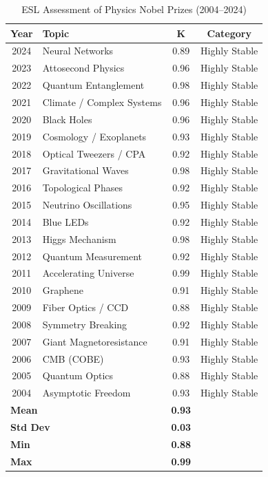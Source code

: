 \documentclass[11pt,a4paper]{article}
\begin{document}
\begin{table}[h]
\centering
\caption{ESL Assessment of Physics Nobel Prizes (2004--2024)}
\begin{tabular}{clcc}
\toprule
\textbf{Year} & \textbf{Topic} & \textbf{K} & \textbf{Category} \\
\midrule
2024 & Neural Networks & 0.89 & Highly Stable \\
2023 & Attosecond Physics & 0.96 & Highly Stable \\
2022 & Quantum Entanglement & 0.98 & Highly Stable \\
2021 & Climate / Complex Systems & 0.96 & Highly Stable \\
2020 & Black Holes & 0.96 & Highly Stable \\
2019 & Cosmology / Exoplanets & 0.93 & Highly Stable \\
2018 & Optical Tweezers / CPA & 0.92 & Highly Stable \\
2017 & Gravitational Waves & 0.98 & Highly Stable \\
2016 & Topological Phases & 0.92 & Highly Stable \\
2015 & Neutrino Oscillations & 0.95 & Highly Stable \\
2014 & Blue LEDs & 0.92 & Highly Stable \\
2013 & Higgs Mechanism & 0.98 & Highly Stable \\
2012 & Quantum Measurement & 0.92 & Highly Stable \\
2011 & Accelerating Universe & 0.99 & Highly Stable \\
2010 & Graphene & 0.91 & Highly Stable \\
2009 & Fiber Optics / CCD & 0.88 & Highly Stable \\
2008 & Symmetry Breaking & 0.92 & Highly Stable \\
2007 & Giant Magnetoresistance & 0.91 & Highly Stable \\
2006 & CMB (COBE) & 0.93 & Highly Stable \\
2005 & Quantum Optics & 0.88 & Highly Stable \\
2004 & Asymptotic Freedom & 0.93 & Highly Stable \\
\midrule
\multicolumn{2}{l}{\textbf{Mean}} & \textbf{0.93} & \\
\multicolumn{2}{l}{\textbf{Std Dev}} & \textbf{0.03} & \\
\multicolumn{2}{l}{\textbf{Min}} & \textbf{0.88} & \\
\multicolumn{2}{l}{\textbf{Max}} & \textbf{0.99} & \\
\bottomrule
\end{tabular}
\end{table}
\end{document}
